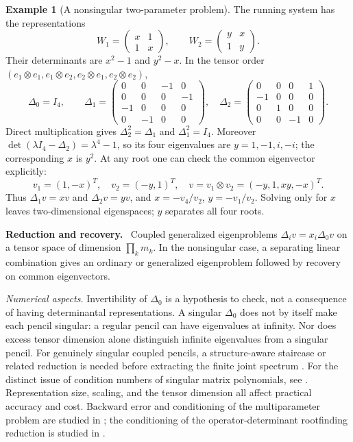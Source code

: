 \documentclass[12pt]{article}
\theoremstyle{definition}
\newtheorem{example}[theorem]{Example}
\theoremstyle{remark}
\newenvironment{reduction}
  {\par\medskip\noindent\textbf{Reduction and recovery.}\ }
  {\par\medskip}
\begin{document}
\begin{example}[A nonsingular two-parameter problem]\label{ex:mep-running}
  The running system has the representations
  \[
    W_1=\begin{pmatrix}x&1\\1&x\end{pmatrix},\qquad
    W_2=\begin{pmatrix}y&x\\1&y\end{pmatrix}.
  \]
  Their determinants are $x^2-1$ and $y^2-x$. In the tensor order
  $(e_1\otimes e_1,e_1\otimes e_2,e_2\otimes e_1,e_2\otimes e_2)$,
  \[
    \Delta_0=I_4,\qquad
    \Delta_1=\begin{pmatrix}0&0&-1&0\\0&0&0&-1\\-1&0&0&0\\0&-1&0&0\end{pmatrix},
    \quad
    \Delta_2=\begin{pmatrix}0&0&0&1\\-1&0&0&0\\0&1&0&0\\0&0&-1&0\end{pmatrix}.
  \]
  Direct multiplication gives $\Delta_2^2=\Delta_1$ and $\Delta_1^2=I_4$.
  Moreover $\det(\lambda I_4-\Delta_2)=\lambda^4-1$, so its four eigenvalues are
  $y=1,-1,i,-i$; the corresponding $x$ is $y^2$.
  At any root one can check the common eigenvector explicitly:
  \[
    v_1=(1,-x)^T,\quad v_2=(-y,1)^T,\quad
    v=v_1\otimes v_2=(-y,1,xy,-x)^T.
  \]
  Thus $\Delta_1v=xv$ and $\Delta_2v=yv$, and $x=-v_4/v_2$, $y=-v_1/v_2$.
  Solving only for $x$ leaves two-dimensional eigenspaces; $y$ separates all four roots.
\end{example}

\begin{reduction}
  Coupled generalized eigenproblems $\Delta_i v=x_i\Delta_0v$ on a tensor space of
  dimension $\prod_km_k$. In the nonsingular case, a separating linear combination
  gives an ordinary or generalized eigenproblem followed by recovery on common eigenvectors.
\end{reduction}

\emph{Numerical aspects.} Invertibility of $\Delta_0$ is a hypothesis to check, not a
consequence of having determinantal representations. A singular $\Delta_0$ does not by
itself make each pencil singular: a regular pencil can have eigenvalues at infinity.
Nor does excess tensor dimension alone distinguish infinite eigenvalues from a singular
pencil. For genuinely singular coupled pencils, a structure-aware staircase or related
reduction is needed before extracting the finite joint spectrum
\cite{plestenjak2016roots}. For the distinct issue of condition numbers of singular
matrix polynomials, see \cite{lotz2020wilkinson}. Representation size, scaling, and the tensor dimension all
affect practical accuracy and cost. Backward error and conditioning of the multiparameter
problem are studied in \cite{hochstenbach2003backward}; the conditioning of the
operator-determinant rootfinding reduction is studied in \cite{graf2026numerical}.
\end{document}
